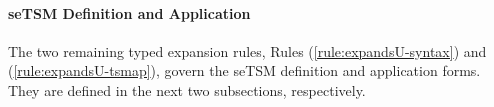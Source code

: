 \paragraph{seTSM Definition and Application} The two remaining typed expansion rules, Rules (\ref{rule:expandsU-syntax}) and (\ref{rule:expandsU-tsmap}), govern the seTSM definition and application forms. They are defined in the next two subsections, respectively. 



